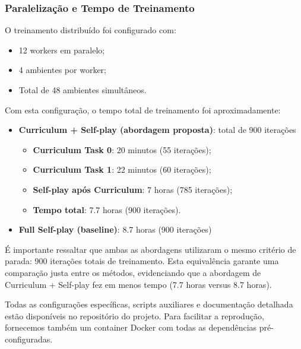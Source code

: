 \subsubsection{Paralelização e Tempo de Treinamento}

O treinamento distribuído foi configurado com:

\begin{itemize}
    \item 12 workers em paralelo;
    \item 4 ambientes por worker;
    \item Total de 48 ambientes simultâneos.
\end{itemize}

Com esta configuração, o tempo total de treinamento foi aproximadamente:

\begin{itemize}
    \item \textbf{Curriculum + Self-play (abordagem proposta)}: total de 900 iterações
    \begin{itemize}
        \item \textbf{Curriculum Task 0}: 20 minutos (55 iterações);
        \item \textbf{Curriculum Task 1}: 22 minutos (60 iterações);
        \item \textbf{Self-play após Curriculum}: 7 horas (785 iterações);
        \item \textbf{Tempo total}: 7.7 horas (900 iterações).
    \end{itemize}
    \item \textbf{Full Self-play (baseline)}: 8.7 horas (900 iterações)
\end{itemize}

É importante ressaltar que ambas as abordagens utilizaram o mesmo critério de parada: 900 iterações totais de treinamento. Esta equivalência garante uma comparação justa entre os métodos, evidenciando que a abordagem de Curriculum + Self-play fez em menos tempo (7.7 horas versus 8.7 horas).

Todas as configurações específicas, scripts auxiliares e documentação detalhada estão disponíveis no repositório do projeto. Para facilitar a reprodução, fornecemos também um container Docker com todas as dependências pré-configuradas.
